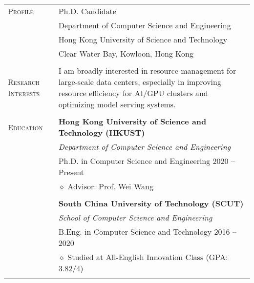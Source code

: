 \documentclass[letterpaper, 11pt]{article}
\begin{document}
\begin{longtable}{p{1in}p{5in}}

{\textsc{Profile}}
& Ph.D. Candidate \\
& Department of Computer Science and Engineering \\
& Hong Kong University of Science and Technology \\
& Clear Water Bay, Kowloon, Hong Kong \\
& \\

\nohyphens{\textsc{Research Interests}}
& I am broadly interested in resource management for large-scale data centers, especially in improving resource efficiency for AI/GPU clusters and optimizing model serving systems. \\
& \\

{\textsc{Education}}
& \textbf{Hong Kong University of Science and Technology (HKUST)} \\
& \textit{Department of Computer Science and Engineering} \\
& Ph.D. in Computer Science and Engineering \hfill 2020 -- Present \\
& $\diamond$ Advisor: Prof. Wei Wang \\
& \\

& \textbf{South China University of Technology (SCUT)} \\
& \textit{School of Computer Science and Engineering} \\
& B.Eng. in Computer Science and Technology \hfill 2016 -- 2020 \\
& $\diamond$ Studied at All-English Innovation Class (GPA: 3.82/4) \\
& \\



\end{longtable}
\end{document}
